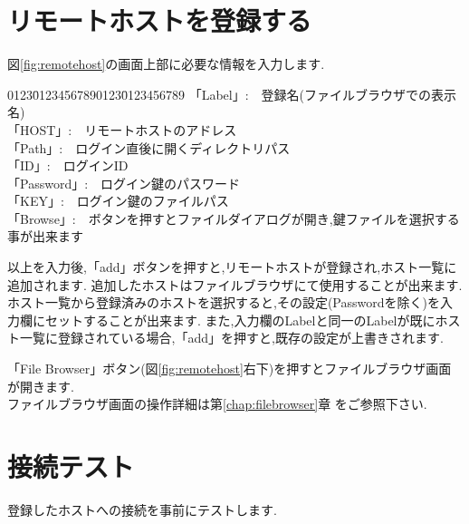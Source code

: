 \documentclass[a4paper,10pt,oneside]{jsbook}
\begin{document}
\newpage 

\section{リモートホストを登録する}
図\ref{fig:remotehost}の画面上部に必要な情報を入力します.
\begin{tabbing}
0123\=01234567890123\=0123456789\kill
\>「Label」\>:\ \ 登録名(ファイルブラウザでの表示名)\\
\>「HOST」\>:\ \ リモートホストのアドレス\\
\>「Path」\>:\ \ ログイン直後に開くディレクトリパス\\
\>「ID」\>:\ \ ログインID\\
\>「Password」\>:\ \ ログイン鍵のパスワード\\
\>「KEY」\>:\ \ ログイン鍵のファイルパス\\
\>「Browse」\>:\ \ ボタンを押すとファイルダイアログが開き,鍵ファイルを選択する事が出来ます
\end{tabbing}

以上を入力後,「add」ボタンを押すと,リモートホストが登録され,ホスト一覧に追加されます.
追加したホストはファイルブラウザにて使用することが出来ます.
ホスト一覧から登録済みのホストを選択すると,その設定(Passwordを除く)を入力欄にセットすることが出来ます.
また,入力欄のLabelと同一のLabelが既にホスト一覧に登録されている場合,「add」を押すと,既存の設定が上書きされます.

「File Browser」ボタン(図\ref{fig:remotehost}右下)を押すとファイルブラウザ画面が開きます. \\
ファイルブラウザ画面の操作詳細は第\ref{chap:filebrowser}章 をご参照下さい.

\newpage
\section{接続テスト}
登録したホストへの接続を事前にテストします.
\end{document}
